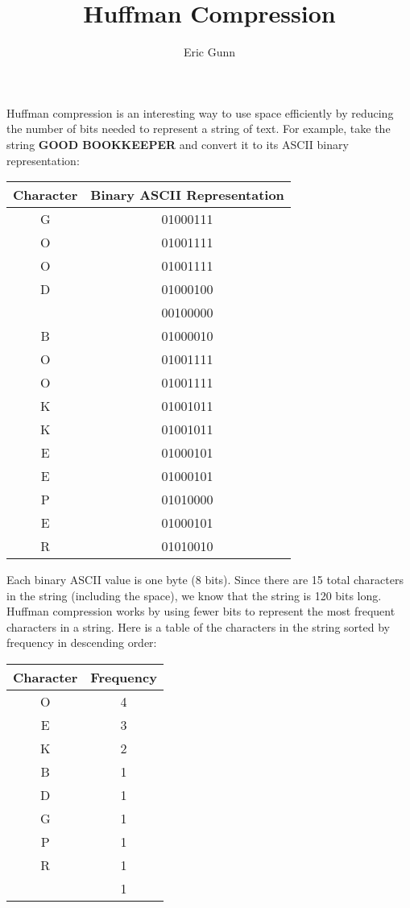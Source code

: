\documentclass{article}
\title{Huffman Compression}
\author{Eric Gunn}
\date{}%
\begin{document}
\maketitle %

Huffman compression is an interesting way to use space efficiently by reducing the number of bits needed to represent a string of text. For example, take the string \textbf{GOOD BOOKKEEPER} and convert it to its ASCII binary representation:
	\begin{center}
		\begin{tabular}{| c | c |}
			\hline
			Character & Binary ASCII Representation\\
			\hline
			G & 01000111\\
			O & 01001111\\
			O & 01001111\\
			D & 01000100\\
			  & 00100000\\
			B & 01000010\\
			O & 01001111\\
			O & 01001111\\
			K & 01001011\\
			K & 01001011\\
			E & 01000101\\
			E & 01000101\\
			P & 01010000\\
			E & 01000101\\
			R & 01010010\\
			\hline
		\end{tabular}
	\end{center}
Each binary ASCII value is one byte (8 bits). Since there are 15 total characters in the string (including the space), we know that the string is 120 bits long. Huffman compression works by using fewer bits to represent the most frequent characters in a string. Here is a table of the characters in the string sorted by frequency in descending order:
	\begin{center}
		\begin{tabular}{| c | c |}
			\hline
			Character & Frequency\\
			\hline
			O & 4\\
			E & 3\\
			K & 2\\
			B & 1\\
			D & 1\\
			G & 1\\
			P & 1\\
			R & 1\\
			  & 1\\
			\hline
		\end{tabular}
	\end{center}
\end{document}
